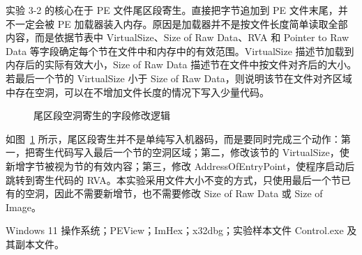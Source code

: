 ﻿\documentclass[12pt]{ctexart}
\begin{document}
实验 3-2 的核心在于 PE 文件尾区段寄生。直接把字节追加到 PE 文件末尾，并不一定会被 PE 加载器装入内存。原因是加载器并不是按文件长度简单读取全部内容，而是依据节表中 VirtualSize、Size of Raw Data、RVA 和 Pointer to Raw Data 等字段确定每个节在文件中和内存中的有效范围。VirtualSize 描述节加载到内存后的实际有效大小，Size of Raw Data 描述节在文件中按文件对齐后的大小。若最后一个节的 VirtualSize 小于 Size of Raw Data，则说明该节在文件对齐区域中存在空洞，可以在不增加文件长度的情况下写入少量代码。

\begin{figure}[H]
    \centering
    \caption{尾区段空洞寄生的字段修改逻辑}
    \label{fig:tail-infection-principle}
\end{figure}

如图~\ref{fig:tail-infection-principle} 所示，尾区段寄生并不是单纯写入机器码，而是要同时完成三个动作：第一，把寄生代码写入最后一个节的空洞区域；第二，修改该节的 VirtualSize，使新增字节被视为节的有效内容；第三，修改 AddressOfEntryPoint，使程序启动后跳转到寄生代码的 RVA。本实验采用文件大小不变的方式，只使用最后一个节已有的空洞，因此不需要新增节，也不需要修改 Size of Raw Data 或 Size of Image。

\vspace{0.8cm}


Windows 11 操作系统；PEView；ImHex；x32dbg；实验样本文件 Control.exe 及其副本文件。

\vspace{0.8cm}

\end{document}
